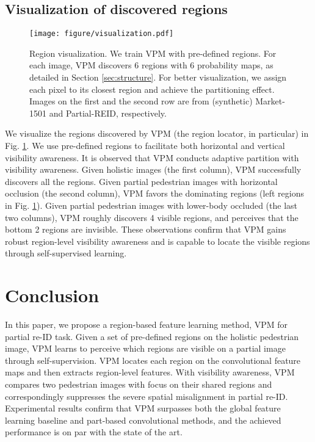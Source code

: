 \documentclass[10pt,twocolumn,letterpaper]{article}
\begin{document}
\subsection{Visualization of discovered regions}
\begin{figure}[t]
\setlength{\abovecaptionskip}{-0.2cm} 
\setlength{\belowcaptionskip}{-0.5cm}
\begin{center}
\texttt{[image: figure/visualization.pdf]}
\end{center}
   \caption{Region visualization. We train VPM with  pre-defined regions. For each image, VPM discovers 6 regions with 6 probability maps, as detailed in Section \ref{sec:structure}. For better visualization, we assign each pixel to its closest region and achieve the partitioning effect. Images on the first and the second row are from (synthetic) Market-1501 and Partial-REID, respectively.}
\label{fig:visual}
\end{figure}
We visualize the regions discovered by VPM (the region locator, in particular) in Fig. \ref{fig:visual}. We use  pre-defined regions to facilitate both horizontal and vertical visibility awareness. 
It is observed that VPM conducts adaptive partition with visibility awareness. Given holistic images (the first column), VPM successfully discovers all the  regions. Given partial pedestrian images with horizontal occlusion (the second column), VPM favors the dominating regions (left regions in Fig. \ref{fig:visual}). Given partial pedestrian images with lower-body occluded (the last two columns), VPM roughly discovers 4 visible regions, and perceives that the bottom 2 regions are invisible. These observations confirm that VPM gains robust region-level visibility awareness and is capable to locate the visible regions through self-supervised learning.

\section{Conclusion}
In this paper, we propose a region-based feature learning method, VPM for partial re-ID task. Given a set of pre-defined regions on the holistic pedestrian image, VPM learns to perceive which regions are visible on a partial image through self-supervision. VPM locates each region on the convolutional feature maps and then extracts region-level features. With visibility awareness, VPM compares two pedestrian images with focus on their shared regions and correspondingly suppresses the severe spatial misalignment in partial re-ID. Experimental results confirm that VPM surpasses both the global feature learning baseline and part-based convolutional methods, and the achieved performance is on par with the state of the art.  

{\small


}
\end{document}
